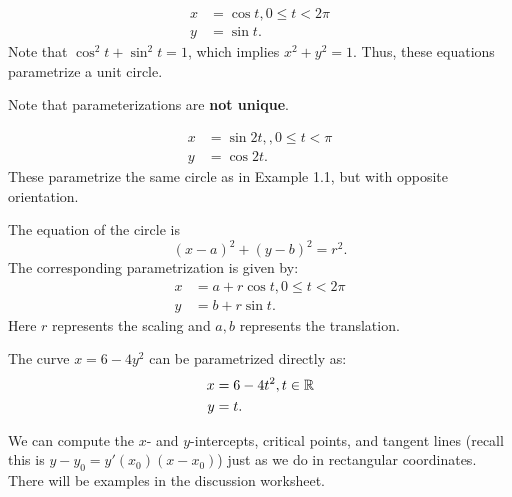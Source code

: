 \begin{ex}
    \begin{align*}
        x &= \cos t, 0\leq t < 2\pi \\
        y &= \sin t.
    \end{align*}
    Note that $\cos^2 t + \sin^2 t = 1$, which implies $x^2 + y^2 = 1$. Thus, these equations parametrize a unit circle.
\end{ex}

Note that parameterizations are \textbf{not unique}.
\begin{ex}
    \begin{align*}
        x &= \sin 2t, , 0\leq t < \pi \\
        y &= \cos 2t.
    \end{align*}
    These parametrize the same circle as in Example 1.1, but with opposite orientation.
\end{ex}


\begin{ex}
    The equation of the circle is 
    \[(x - a)^2 + (y - b)^2 = r^2.\]
    The corresponding parametrization is given by:
    \begin{align*}
        x &= a + r \cos t, 0\leq t < 2\pi\\
        y &= b + r \sin t.
    \end{align*}
    Here $r$ represents the scaling and $a,b$ represents the translation.
\end{ex}

\begin{ex}[Parabola]
    The curve $x = 6 - 4y^2$ can be parametrized directly as:
    \begin{align*}
        x &= 6 - 4t^2, t \in \mathbb{R} \\
        y &= t.
    \end{align*}
\end{ex}


We can compute the $x$- and $y$-intercepts, critical points, and tangent lines (recall this is $y-y_0 = y'(x_0) (x-x_0)$) just as we do in rectangular coordinates. There will be examples in the discussion worksheet.



